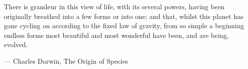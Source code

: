 
\clearforchapter
\thispagestyle{empty}

\begin{center}
  \vspace*{250pt}
  \let\oldepigraphwidth\epigraphwidth
  \setlength{\epigraphwidth}{7.5cm}
  \epigraph{
    \normalsize
    There is grandeur in this view of life, with its several powers, having been originally breathed into a few forms or into one; and that, whilst this planet has gone cycling on according to the fixed law of gravity, from so simple a beginning endless forms most beautiful and most wonderful have been, and are being, evolved.
  }%
  {\textup{--- Charles Darwin, The Origin of Species}}
  \let\epigraphwidth\oldepigraphwidth
\end{center}

\cleardoublepage
